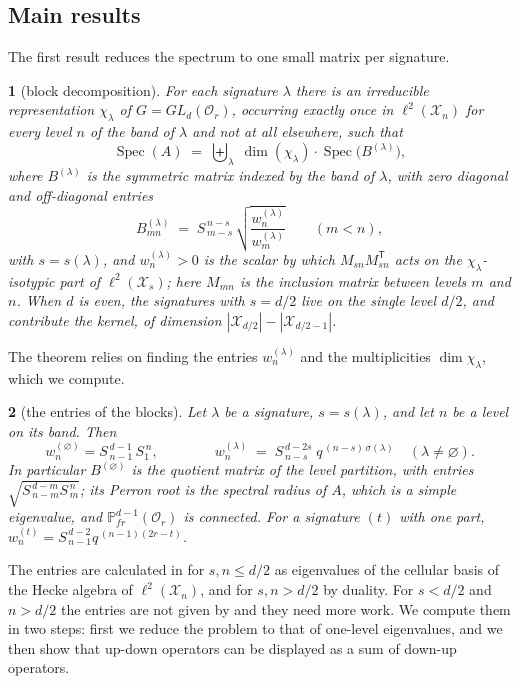 \documentclass[11pt]{article}
\numberwithin{equation}{section}
\theoremstyle{plain}
\newcommand{\restatedname}{}
\newtheorem*{restated}{\restatedname}
\newenvironment{restate}[2]{\renewcommand{\restatedname}{#1~\ref{#2}}\begin{restated}}{\end{restated}}
\theoremstyle{definition}
\begin{document}
\subsection{Main results}\label{sec:1.2}

The first result reduces the spectrum to one small matrix per signature.

\begin{restate}{Theorem}{thm:4.4}[block decomposition]
For each signature $\lambda$ there is an
irreducible representation $\chi_\lambda$ of $G=GL_d(\mathcal{O}_r)$, occurring exactly once in
$\ell^2(\mathcal{X}_n)$ for every level $n$ of the band of $\lambda$ and not at all elsewhere,
such that
\[
\operatorname{Spec}(A)\;=\;\biguplus_{\lambda}\;\dim(\chi_\lambda)\cdot
\operatorname{Spec}\bigl(B^{(\lambda)}\bigr),
\]
where $B^{(\lambda)}$ is the symmetric matrix indexed by the band of $\lambda$, with
zero diagonal and off-diagonal entries
\[
B^{(\lambda)}_{mn}\;=\;S^{\,n-s}_{\,m-s}\,
\sqrt{\frac{w^{(\lambda)}_n}{w^{(\lambda)}_m}}\qquad(m<n),
\]
with $s=s(\lambda)$, and $w^{(\lambda)}_n>0$ is the scalar by which $M_{sn}M_{sn}^{\mathsf T}$ acts on
the $\chi_\lambda$-isotypic part of $\ell^2(\mathcal{X}_{s})$; here $M_{mn}$ is the inclusion
matrix between levels $m$ and $n$. When $d$ is even, the signatures with $s=d/2$ live
on the single level $d/2$, and contribute the kernel, of dimension
$|\mathcal{X}_{d/2}|-|\mathcal{X}_{d/2-1}|$.
\end{restate}

The theorem relies on finding the entries $w^{(\lambda)}_n$ and the multiplicities
$\dim\chi_\lambda$, which we compute.

\begin{restate}{Theorem}{thm:6.15}[the entries of the blocks]
Let $\lambda$ be a signature, $s=s(\lambda)$, and let $n$
be a level on its band. Then
\[
w^{(\varnothing)}_n=S^{\,d-1}_{\,n-1}\,S^{\,n}_{1},
\qquad\qquad
w^{(\lambda)}_n\;=\;S^{\,d-2s}_{\,n-s}\;q^{\,(n-s)\,\sigma(\lambda)}\quad(\lambda\ne\varnothing).
\]
In particular $B^{(\varnothing)}$ is the quotient matrix of the level partition, with
entries $\sqrt{S^{\,d-m}_{\,n-m}S^{\,n}_{\,m}}$; its Perron root is the spectral
radius of $A$, which is a simple eigenvalue, and $\mathbb{P}^{d-1}_{fr}(\mathcal{O}_r)$ is connected.
For a signature $(t)$ with one part, $w^{(t)}_n=S^{\,d-2}_{\,n-1}q^{\,(n-1)(2r-t)}$.
\end{restate}

The entries are calculated in \cite{BO12} for $s,n\le d/2$ as eigenvalues of the cellular basis of the Hecke algebra of $\ell^2(\mathcal{X}_n)$, and for $s,n>d/2$ by duality.
For $s<d/2$ and $n>d/2$ the entries are not given by \cite{BO12} and they need more work.
We compute them in two steps: first we reduce the problem to that of one-level eigenvalues, and we then show that up-down operators can be displayed as a sum of down-up operators.
\end{document}

